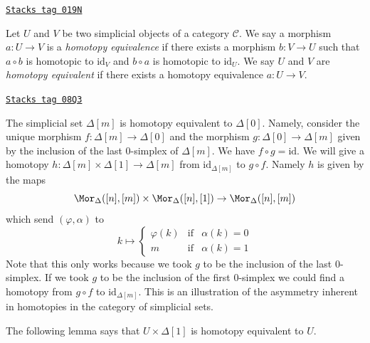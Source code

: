 \begin{definition}
\label{simplicial-definition-homotopy-equivalent}
\href{https://stacks.math.columbia.edu/tag/019N}{\texttt{Stacks tag 019N}}

Let $U$ and $V$ be two simplicial objects of a category $\mathcal{C}$.
We say a morphism $a : U \to V$ is a {\it homotopy equivalence}
if there exists a morphism $b : V \to U$ such that $a \circ b$ is
homotopic to $\text{id}_V$ and $b \circ a$ is homotopic to $\text{id}_U$.
We say $U$ and $V$ are {\it homotopy equivalent} if there
exists a homotopy equivalence $a : U \to V$.
\end{definition}

\begin{example}
\label{simplicial-example-simplex-contractible}
\href{https://stacks.math.columbia.edu/tag/08Q3}{\texttt{Stacks tag 08Q3}}

The simplicial set $\Delta[m]$ is homotopy equivalent to $\Delta[0]$.
Namely, consider the unique morphism $f : \Delta[m] \to \Delta[0]$ and
the morphism $g : \Delta[0] \to \Delta[m]$ given by the inclusion of the
last $0$-simplex of $\Delta[m]$. We have $f \circ g = \text{id}$.
We will give a homotopy $h : \Delta[m] \times \Delta[1] \to \Delta[m]$
from $\text{id}_{\Delta[m]}$ to $g \circ f$. Namely $h$ is given by
the maps
$$
\Mor_\Delta([n], [m]) \times \Mor_\Delta([n], [1]) \to \Mor_\Delta([n], [m])
$$
which send $(\varphi, \alpha)$ to
$$
k \mapsto
\left\{
\begin{matrix}
\varphi(k) & \text{if} & \alpha(k) = 0 \\
m & \text{if} & \alpha(k) = 1
\end{matrix}
\right.
$$
Note that this only works because we took $g$ to be the inclusion of the
last $0$-simplex. If we took $g$ to be the inclusion of the first $0$-simplex
we could find a homotopy from $g \circ f$ to $\text{id}_{\Delta[m]}$.
This is an illustration of the asymmetry inherent in homotopies in the
category of simplicial sets.
\end{example}

The following lemma says that $U \times \Delta[1]$
is homotopy equivalent to $U$.

